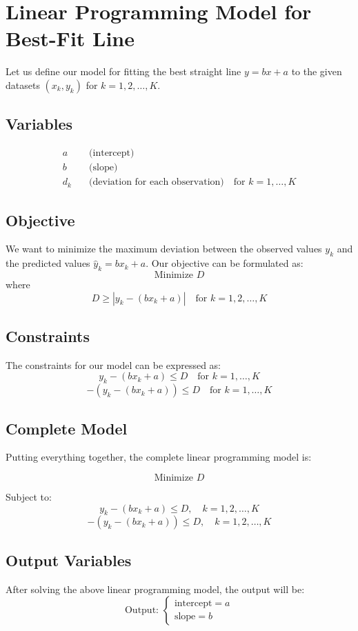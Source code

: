 \documentclass{article}
\begin{document}
\section*{Linear Programming Model for Best-Fit Line}

Let us define our model for fitting the best straight line \( y = bx + a \) to the given datasets \((x_k, y_k)\) for \( k = 1, 2, \ldots, K \).

\subsection*{Variables}
\begin{align*}
a & \quad \text{(intercept)} \\
b & \quad \text{(slope)} \\
d_k & \quad \text{(deviation for each observation)} \quad \text{for } k = 1, \ldots, K
\end{align*}

\subsection*{Objective}
We want to minimize the maximum deviation between the observed values \( y_k \) and the predicted values \( \hat{y}_k = bx_k + a \). Our objective can be formulated as:
\[
\text{Minimize } D
\]
where
\[
D \geq |y_k - (bx_k + a)| \quad \text{for } k = 1, 2, \ldots, K
\]

\subsection*{Constraints}
The constraints for our model can be expressed as:
\[
y_k - (bx_k + a) \leq D \quad \text{for } k = 1, \ldots, K
\]
\[
-(y_k - (bx_k + a)) \leq D \quad \text{for } k = 1, \ldots, K
\]

\subsection*{Complete Model}
Putting everything together, the complete linear programming model is:

\[
\text{Minimize } D
\]

Subject to:
\[
y_k - (bx_k + a) \leq D, \quad k = 1, 2, \ldots, K
\]
\[
-(y_k - (bx_k + a)) \leq D, \quad k = 1, 2, \ldots, K
\]

\subsection*{Output Variables}
After solving the above linear programming model, the output will be:
\[
\text{Output: } 
\begin{cases}
\text{intercept} = a \\
\text{slope} = b
\end{cases}
\]
\end{document}
